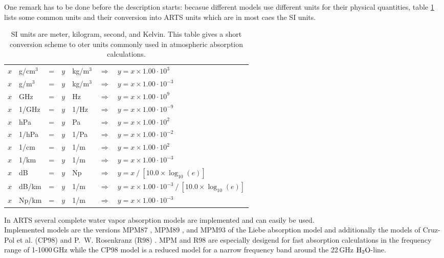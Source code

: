 One remark has to be done before the description starts: becasue different 
models use different units for their physical quantities,
table \ref{table:si_units} lists some common units and their conversion into 
ARTS units which are in most caes the SI units.
\begin{table}[!ht]
\begin{center}
\begin{tabular}{r@{~}lcr@{~}lll}
\hline
$x$ & g/cm$^3$ & = & $y$ & kg/m$^3$ & $\Longrightarrow$ & $y = x \times 1.00\cdot 10^{3}$ \\
$x$ & g/m$^3$  & = & $y$ & kg/m$^3$ & $\Longrightarrow$ & $y = x \times 1.00\cdot 10^{-3}$ \\
$x$ & GHz      & = & $y$ & Hz       & $\Longrightarrow$ & $y = x \times 1.00\cdot 10^{9}$ \\
$x$ & 1/GHz    & = & $y$ & 1/Hz     & $\Longrightarrow$ & $y = x \times 1.00\cdot 10^{-9}$ \\
$x$ & hPa      & = & $y$ & Pa       & $\Longrightarrow$ & $y = x \times 1.00\cdot 10^{2}$ \\
$x$ & 1/hPa    & = & $y$ & 1/Pa     & $\Longrightarrow$ & $y = x \times 1.00\cdot 10^{-2}$ \\
$x$ & 1/cm     & = & $y$ & 1/m      & $\Longrightarrow$ & $y = x \times 1.00\cdot 10^{2}$ \\
$x$ & 1/km     & = & $y$ & 1/m      & $\Longrightarrow$ & $y = x \times 1.00\cdot 10^{-3}$ \\
$x$ & dB       & = & $y$ & Np       & $\Longrightarrow$ & $y = x~/~[10.0 \times \log_{10}{(e)}]$ \\
$x$ & dB/km    & = & $y$ & 1/m      & $\Longrightarrow$ & $y = x \times 1.00\cdot 10^{-3}~/~[10.0 \times \log_{10}{(e)}]$\\
$x$ & Np/km    & = & $y$ & 1/m      & $\Longrightarrow$ & $y = x \times 1.00\cdot 10^{-3}$ \\
\hline
\end{tabular}
\caption{SI units are meter, kilogram, second, and Kelvin. 
  This table gives a short conversion scheme to oter units
  commonly used in atmospheric absorption calculations.}
\label{table:si_units}
\end{center}
\end{table}
%
%
%
%
\label{levelc:CompWatVapMod}
%
In ARTS several complete water vapor absorption models are implemented and 
can easily be used.\\
Implemented models are the versions MPM87 \cite{liebeandlayton:87}, MPM89 
\cite{liebe:89}, and MPM93 \cite{liebeetal:93} of the Liebe absorption 
model and additionally the models of Cruz-Pol et al. (CP98) \cite{cruzpol:98} 
and P.~W. Rosenkranz (R98) \cite{pwr:98}. 
MPM and R98 are especially desigend for fast absorption calculations in 
the frequency range of 1-1000\,GHz while the CP98 model is a reduced model 
for a narrow frequency band around the 22\,GHz $\mbox{H}_2\mbox{O}$-line.

